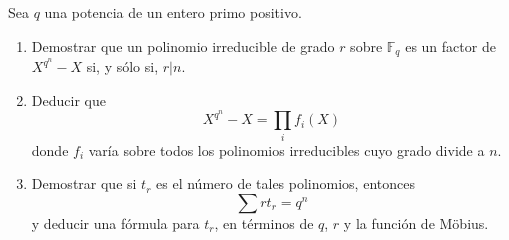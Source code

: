 \documentclass[a4paper, 11pt]{article}
\begin{document}
  \maketitle
  \begin{ejercicio}
      Sea $q$ una potencia de un entero primo positivo.
      \begin{enumerate}
          \item Demostrar que un polinomio irreducible de grado $r$ sobre $\mathbb{F}_q$ es un factor de $X^{q^n}-X$ si, y sólo si, $r|n$.
          \item Deducir que
          \[
          X^{q^n}-X = \prod_i f_i(X)
          \]
          donde $f_i$ varía sobre todos los polinomios irreducibles cuyo grado divide a $n$.
          \item Demostrar que si $t_r$ es el número de tales polinomios, entonces
          \[
          \sum r t_r = q^n
          \]
          y deducir una fórmula para $t_r$, en términos de $q$, $r$ y la función de Möbius.
      \end{enumerate}
  \end{ejercicio}
\end{document}
